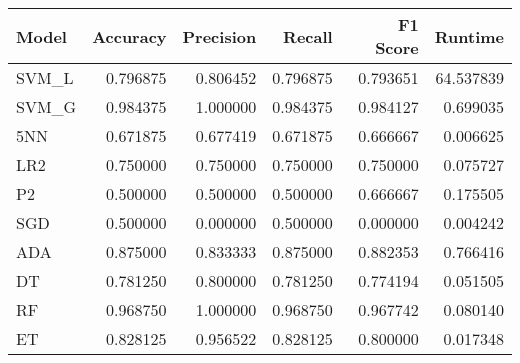 \begin{tabular}{lrrrrr}
\toprule
     Model &   Accuracy & Precision &  Recall &  F1 Score &  Runtime \\
\midrule
 SVM\_L &  0.796875 &  0.806452 &  0.796875 &  0.793651 &  64.537839 \\
 SVM\_G &  0.984375 &  1.000000 &  0.984375 &  0.984127 &   0.699035 \\
   5NN &  0.671875 &  0.677419 &  0.671875 &  0.666667 &   0.006625 \\
   LR2 &  0.750000 &  0.750000 &  0.750000 &  0.750000 &   0.075727 \\
    P2 &  0.500000 &  0.500000 &  0.500000 &  0.666667 &   0.175505 \\
   SGD &  0.500000 &  0.000000 &  0.500000 &  0.000000 &   0.004242 \\
   ADA &  0.875000 &  0.833333 &  0.875000 &  0.882353 &   0.766416 \\
    DT &  0.781250 &  0.800000 &  0.781250 &  0.774194 &   0.051505 \\
    RF &  0.968750 &  1.000000 &  0.968750 &  0.967742 &   0.080140 \\
    ET &  0.828125 &  0.956522 &  0.828125 &  0.800000 &   0.017348 \\
\bottomrule
\end{tabular}